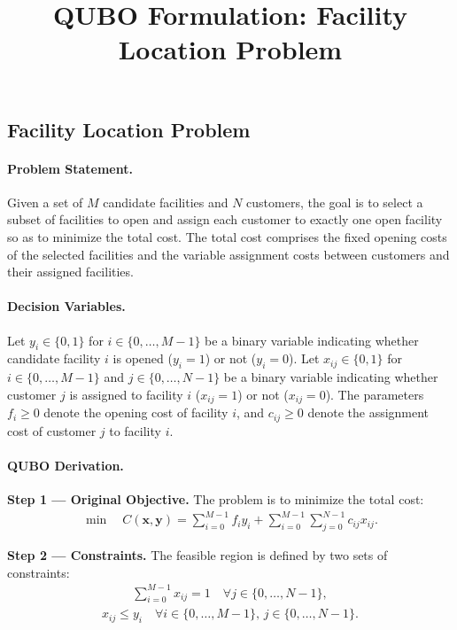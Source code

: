 \documentclass[12pt]{article}
\title{QUBO Formulation: Facility Location Problem}
\date{}
\begin{document}
\maketitle

\subsection*{Facility Location Problem}

\paragraph{Problem Statement.}
Given a set of $M$ candidate facilities and $N$ customers, the goal is to select a subset of facilities to open and assign each customer to exactly one open facility so as to minimize the total cost. The total cost comprises the fixed opening costs of the selected facilities and the variable assignment costs between customers and their assigned facilities.

\paragraph{Decision Variables.}
Let $y_i \in \{0,1\}$ for $i \in \{0,\dots,M-1\}$ be a binary variable indicating whether candidate facility $i$ is opened ($y_i=1$) or not ($y_i=0$).
Let $x_{ij} \in \{0,1\}$ for $i \in \{0,\dots,M-1\}$ and $j \in \{0,\dots,N-1\}$ be a binary variable indicating whether customer $j$ is assigned to facility $i$ ($x_{ij}=1$) or not ($x_{ij}=0$).
The parameters $f_i \ge 0$ denote the opening cost of facility $i$, and $c_{ij} \ge 0$ denote the assignment cost of customer $j$ to facility $i$.

\paragraph{QUBO Derivation.}
\textbf{Step 1 --- Original Objective.}
The problem is to minimize the total cost:
\begin{align}
\min \quad C(\mathbf{x},\mathbf{y}) = \sum_{i=0}^{M-1} f_i y_i + \sum_{i=0}^{M-1} \sum_{j=0}^{N-1} c_{ij} x_{ij}.
\end{align}

\textbf{Step 2 --- Constraints.}
The feasible region is defined by two sets of constraints:
\begin{align}
\sum_{i=0}^{M-1} x_{ij} = 1 \quad \forall j \in \{0,\dots,N-1\}, \tag{C1}
\end{align}
\begin{align}
x_{ij} \le y_i \quad \forall i \in \{0,\dots,M-1\}, \, j \in \{0,\dots,N-1\}. \tag{C2}
\end{align}
\end{document}
